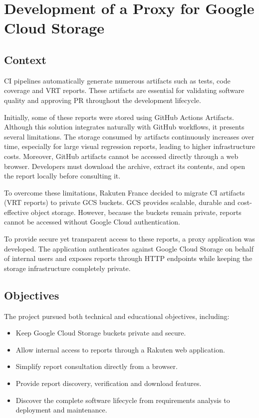\chapter{Development of a Proxy for Google Cloud Storage}

\section{Context}
\acf{CI} pipelines automatically generate numerous artifacts such as tests, code coverage and \ac{VRT} reports. These artifacts are essential for validating software quality and approving \acs{PR} throughout the development lifecycle.

Initially, some of these reports were stored using GitHub Actions Artifacts. Although this solution integrates naturally with GitHub workflows, it presents several limitations. The storage consumed by artifacts continuously increases over time, especially for large visual regression reports, leading to higher infrastructure costs. Moreover, GitHub artifacts cannot be accessed directly through a web browser. Developers must download the archive, extract its contents, and open the report locally before consulting it.

To overcome these limitations, Rakuten France decided to migrate \ac{CI} artifacts (\ac{VRT} reports) to private \acf{GCS} buckets. \ac{GCS} provides scalable, durable and cost-effective object storage. However, because the buckets remain private, reports cannot be accessed without Google Cloud authentication.

To provide secure yet transparent access to these reports, a proxy application was developed. The application authenticates against Google Cloud Storage on behalf of internal users and exposes reports through \acs{HTTP} endpoints while keeping the storage infrastructure completely private.

\section{Objectives}

The project pursued both technical and educational objectives, including:

\begin{itemize}
\item Keep Google Cloud Storage buckets private and secure.
\item Allow internal access to reports through a Rakuten web application.
\item Simplify report consultation directly from a browser.
\item Provide report discovery, verification and download features.
\item Discover the complete software lifecycle from requirements analysis to deployment and maintenance.
\end{itemize}

